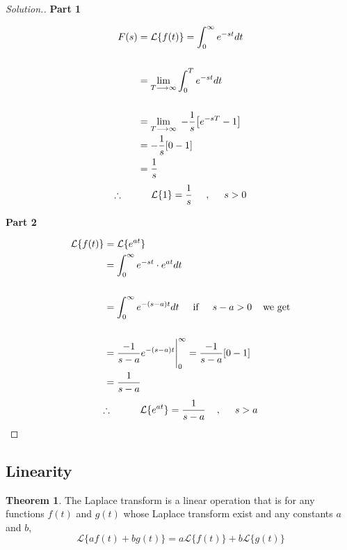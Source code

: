 \documentclass[11pt,a4paper]{article}
\theoremstyle{definition}
\newtheorem{thm}{Theorem}[subsection]
\newenvironment{solution}
  {\renewcommand{\qedsymbol}{}\begin{proof}[\textit{Solution}.]}
  {\end{proof}}
\newcommand{\subhead}[1]{%
  \par\medskip\noindent\textbf{#1}\par\nobreak\smallskip}
\begin{document}
\begin{solution}
\subhead{Part 1}
\begin{align*}
F(s) & = \mathcal{L}\{f(t)\} =  \int^{\infty}_{0} e^{-st}dt\\\\
& = \lim_{T \longrightarrow \infty}\int^T_0 e^{-st}dt\\\\
& = \lim_{T \longrightarrow \infty } \hspace{0.1cm} -\frac{1}{s}\big[e^{-sT}-1\big]\\
& = -\frac{1}{s}[0-1]\\
& = \frac{1}{s} 
\end{align*}
$$\therefore\hspace{1cm} \mathcal{L}\{1\} = \frac{1}{s}\hspace{0.5cm},\hspace{0.5cm} s>0$$

\subhead{Part 2}
\begin{align*}
\mathcal{L}\{f(t)\} & = \mathcal{L}\{e^{at}\}\\
& = \int^{\infty}_0 e^{-st}\cdot e^{at} dt\\\\
& = \int^{\infty}_0 e^{-(s-a)t}dt\hspace{0.5cm} \text{if}\hspace{0.5cm} s - a>0\hspace{0.4cm} \text{we get}\\\\
& = \frac{-1}{s - a}e^{-(s-a)t}\Bigg|^{\infty}_0 = \frac{-1}{s - a}[0 -1]\\
& = \frac{1}{s - a} 
\end{align*}
$$\therefore\hspace{1cm} \mathcal{L}\{e^{at}\} = \frac{1}{s - a}\hspace{0.4cm} , \hspace{0.5cm} s>a$$
\end{solution}

{\color[wave]{485}\subsection{Linearity}}

\begin{thm}


The Laplace transform is a linear operation that is for any functions $f(t)$ and $g(t)$ whose Laplace transform exist and any constants $a$ and $b$, $$\mathcal{L}\{a f(t) + b g(t)\} = a\mathcal{L}\{f(t)\} + b\mathcal{L}\{g(t)\}$$
\end{thm}
\end{document}
